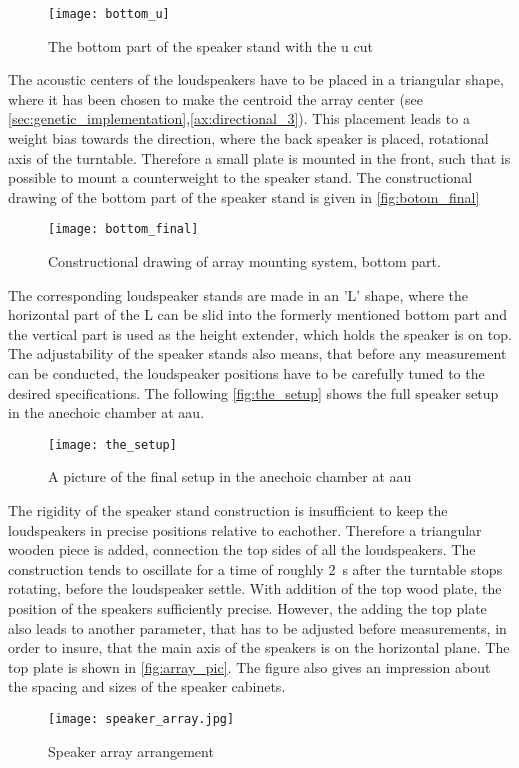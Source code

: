  \begin{figure}[H]
	\centering
	\texttt{[image: bottom\_u]}
	\caption{The bottom part of the speaker stand with the u cut}
		\label{fig:botom_u}
\end{figure}

The acoustic centers of the loudspeakers have to be placed in a triangular shape, where it has been chosen to make the centroid the array center (see \autoref{sec:genetic_implementation},\autoref{ax:directional_3}). This placement leads to a weight bias towards the direction, where the back speaker is placed, rotational axis of the turntable. Therefore a small plate is mounted in the front, such that is possible to mount a counterweight to the speaker stand. The constructional drawing of the bottom part of the speaker stand is given in \autoref{fig:botom_final}

\begin{figure}[H]
	\centering
	\texttt{[image: bottom\_final]}
	\caption{Constructional drawing of array mounting system, bottom part.}
		\label{fig:botom_final}
\end{figure}

The corresponding loudspeaker stands are made in an 'L' shape, where the horizontal part of the L can be slid into the formerly mentioned bottom part and the vertical part is used as the height extender, which holds the speaker is on top. The adjustability of the speaker stands also means, that before any measurement can be conducted, the loudspeaker positions have to be carefully tuned to the desired specifications. The following \autoref{fig:the_setup} shows the full speaker setup in the anechoic chamber at \gls{aau}.

  \begin{figure}[H]
	\centering
	\texttt{[image: the\_setup]}
	\caption{A picture of the final setup in the anechoic chamber at \gls{aau}}
		\label{fig:the_setup}
\end{figure}

The rigidity of the speaker stand construction is insufficient to keep the loudspeakers in precise positions relative to eachother. Therefore a triangular wooden piece is added, connection the top sides of all the loudspeakers. The construction tends to oscillate for a time of roughly \SI{2}{\second} after the turntable stops rotating, before the loudspeaker settle. With addition of the top wood plate, the position of the speakers sufficiently precise. However, the adding the top plate also leads to another parameter, that has to be adjusted before measurements, in order to insure, that the main axis of the speakers is on the horizontal plane. 
The top plate is shown in \autoref{fig:array_pic}. The figure also gives an impression about the spacing and sizes of the speaker cabinets.

\begin{figure}[H]
	\centering
    \texttt{[image: speaker\_array.jpg]}
    \caption{Speaker array arrangement}
    \label{fig:array_pic}
\end{figure}





